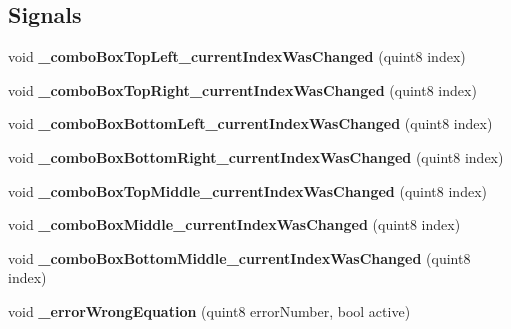 \subsection*{Signals}
\begin{DoxyCompactItemize}
\item 
\mbox{\label{class_setting_trigger_function_ac609100adbddcad936ea3bfd14fff3e0}} 
void {\bfseries \+\_\+combo\+Box\+Top\+Left\+\_\+current\+Index\+Was\+Changed} (quint8 index)
\item 
\mbox{\label{class_setting_trigger_function_ad0b7b743c089bcbf75039c6ecb880075}} 
void {\bfseries \+\_\+combo\+Box\+Top\+Right\+\_\+current\+Index\+Was\+Changed} (quint8 index)
\item 
\mbox{\label{class_setting_trigger_function_a5dad1ad4eb5892a7515417aa9ab3d681}} 
void {\bfseries \+\_\+combo\+Box\+Bottom\+Left\+\_\+current\+Index\+Was\+Changed} (quint8 index)
\item 
\mbox{\label{class_setting_trigger_function_a9066ec81471ea203653b9e03f3c80dae}} 
void {\bfseries \+\_\+combo\+Box\+Bottom\+Right\+\_\+current\+Index\+Was\+Changed} (quint8 index)
\item 
\mbox{\label{class_setting_trigger_function_a2121716d1f4ffe077424f9544b42c01c}} 
void {\bfseries \+\_\+combo\+Box\+Top\+Middle\+\_\+current\+Index\+Was\+Changed} (quint8 index)
\item 
\mbox{\label{class_setting_trigger_function_af8c77bdd18e3856676695fc76e9d1657}} 
void {\bfseries \+\_\+combo\+Box\+Middle\+\_\+current\+Index\+Was\+Changed} (quint8 index)
\item 
\mbox{\label{class_setting_trigger_function_a5bc5c96691ba472461e85e969b49ed85}} 
void {\bfseries \+\_\+combo\+Box\+Bottom\+Middle\+\_\+current\+Index\+Was\+Changed} (quint8 index)
\item 
\mbox{\label{class_setting_trigger_function_ad6f91e4f70b1b66341bbe906a05d002c}} 
void {\bfseries \+\_\+error\+Wrong\+Equation} (quint8 error\+Number, bool active)
\end{DoxyCompactItemize}
